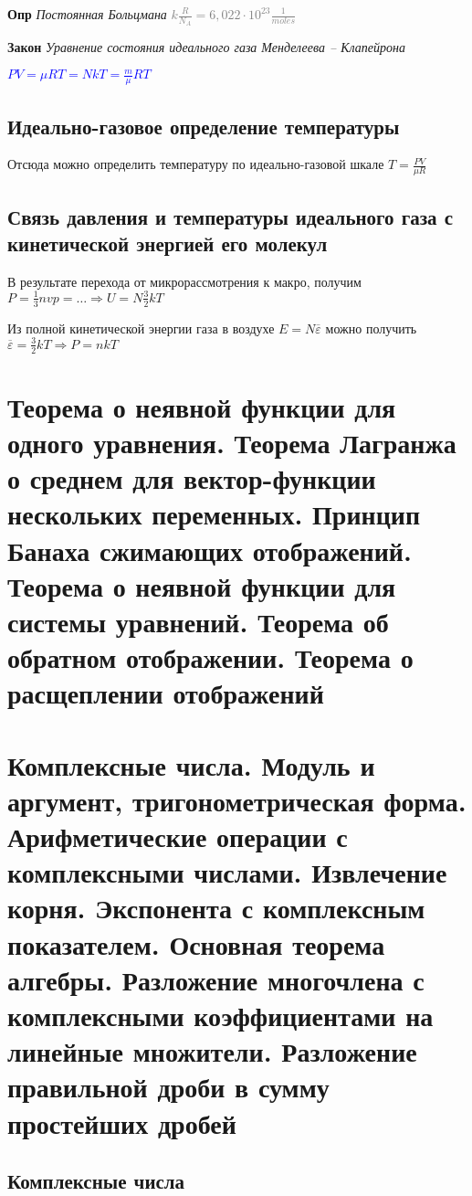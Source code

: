 \documentclass[a4paper, 14pt]{article}
\begin{document}
    \textbf{Опр} \textit{Постоянная Больцмана} \textcolor{gray}{$k \frac{R}{N_A} = 6,022 \cdot 10^{23} \frac{1}{moles}$}

    \textbf{Закон} \textit{Уравнение состояния идеального газа Менделеева -- Клапейрона}

    \textcolor{blue}{$PV = \mu RT = NkT = \frac{m}{\mu} RT$}

    \subsection{Идеально-газовое определение температуры}

    Отсюда можно определить температуру по идеально-газовой шкале $T = \frac{PV}{\mu R}$

    \subsection{Связь давления и температуры идеального газа с кинетической энергией его молекул}

    В результате перехода от микрорассмотрения к макро, получим $P = \frac{1}{3}nvp = \dots \Rightarrow U = N \frac{3}{2}kT$

    Из полной кинетической энергии газа в воздухе $E = N \overline{\varepsilon}$ можно получить $\overline{\varepsilon}
    = \frac{3}{2}kT \Rightarrow P = nkT$

    \section{Теорема о неявной функции для одного уравнения.
    Теорема Лагранжа о среднем для вектор-функции нескольких переменных.
    Принцип Банаха сжимающих отображений.
    Теорема о неявной функции для системы уравнений.
    Теорема об обратном отображении.
    Теорема о расщеплении отображений}

    

    \section{Комплексные числа.
    Модуль и аргумент, тригонометрическая форма.
    Арифметические операции с комплексными числами.
    Извлечение корня.
    Экспонента с комплексным показателем.
    Основная теорема алгебры.
    Разложение многочлена с комплексными коэффициентами на линейные множители.
    Разложение правильной дроби в сумму простейших дробей}

    \subsection{Комплексные числа}
\end{document}
